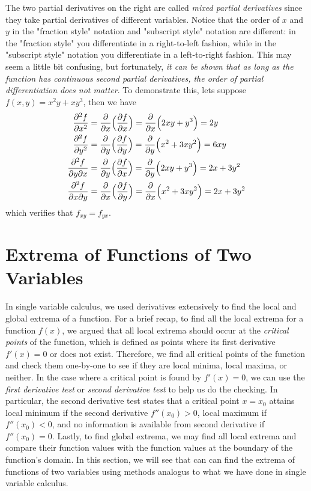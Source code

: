The two partial derivatives on the right are called \textit{mixed partial derivatives} since they take partial derivatives of different variables.  Notice that the order of $x$ and $y$ in the "fraction style" notation and "subscript style" notation are different: in the "fraction style" you differentiate in a right-to-left fashion, while in the "subscript style" notation you differentiate in a left-to-right fashion.  This may seem a little bit confusing, but fortunately, \textit{it can be shown that as long as the function has continuous second partial derivatives, the order of partial differentiation does not matter}.  To demonstrate this, lets suppose $f(x,y) = x^2y + xy^3$, then we have
\begin{align*}
    \frac{\partial^2 f}{\partial x^2} &= \frac{\partial}{\partial x}\Big(\frac{\partial f}{\partial x}\Big) = \frac{\partial}{\partial x}\Big(2xy + y^3\Big) = 2y\\
    \frac{\partial^2 f}{\partial y^2} &= \frac{\partial}{\partial y}\Big(\frac{\partial f}{\partial y}\Big) = \frac{\partial}{\partial y}\Big(x^2 + 3xy^2\Big) = 6xy\\
    \frac{\partial^2 f}{\partial y \partial x} &= \frac{\partial}{\partial y}\Big(\frac{\partial f}{\partial x}\Big) = \frac{\partial}{\partial y}\Big(2xy + y^3\Big) = 2x + 3y^2\\
    \frac{\partial^2 f}{\partial x \partial y} &= \frac{\partial}{\partial x}\Big(\frac{\partial f}{\partial y}\Big) = \frac{\partial}{\partial x}\Big(x^2 + 3xy^2\Big) = 2x + 3y^2
\end{align*}
which verifies that $f_{xy} = f_{yx}$.

\section{Extrema of Functions of Two Variables}

In single variable calculus, we used derivatives extensively to find the local and global extrema of a function.  For a brief recap, to find all the local extrema for a function $f(x)$, we argued that all local extrema should occur at the \textit{critical points} of the function, which is defined as points where its first derivative $f'(x) = 0$ or does not exist.  Therefore, we find all critical points of the function and check them one-by-one to see if they are local minima, local maxima, or neither.  In the case where a critical point is found by $f'(x) = 0$, we can use the \textit{first derivative test} or \textit{second derivative test} to help us do the checking.  In particular, the second derivative test states that a critical point $x = x_0$ attains local minimum if the second derivative $f''(x_0) > 0$, local maximum if $f''(x_0) < 0$, and no information is available from second derivative if $f''(x_0) = 0$.  Lastly, to find global extrema, we may find all local extrema and compare their function values with the function values at the boundary of the function's domain.  In this section, we will see that can can find the extrema of functions of two variables using methods analogus to what we have done in single variable calculus.

